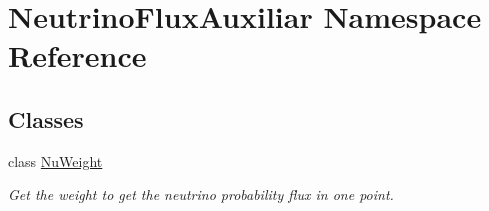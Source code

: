 \hypertarget{namespace_neutrino_flux_auxiliar}{\section{Neutrino\-Flux\-Auxiliar Namespace Reference}
\label{namespace_neutrino_flux_auxiliar}
}
\subsection*{Classes}
\begin{DoxyCompactItemize}
\item 
class \hyperlink{class_neutrino_flux_auxiliar_1_1_nu_weight}{Nu\-Weight}
\begin{DoxyCompactList}\small\item\em Get the weight to get the neutrino probability flux in one point. \end{DoxyCompactList}\end{DoxyCompactItemize}
